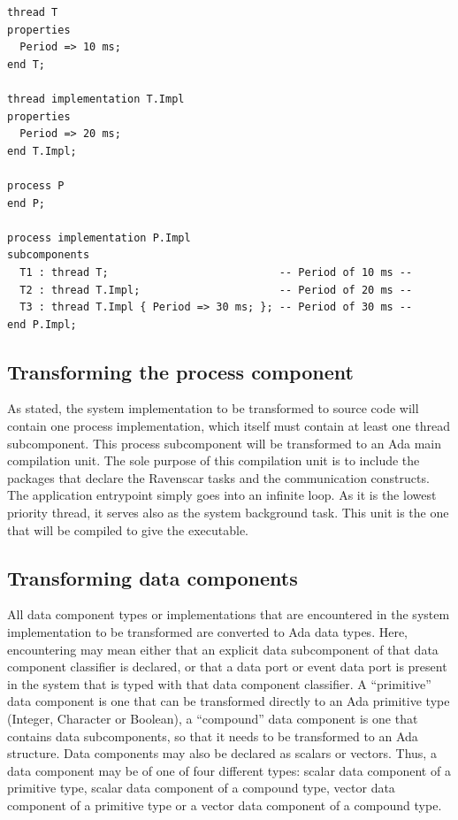 \begin{minipage}[htbp]{\listingwidth}
\lstset{language=aadl}
\begin{lstlisting}[label=lst:effective_prop, caption=The various
    property overriding options.]
thread T
properties
  Period => 10 ms;
end T;

thread implementation T.Impl
properties
  Period => 20 ms;
end T.Impl;

process P
end P;

process implementation P.Impl
subcomponents
  T1 : thread T;                           -- Period of 10 ms --
  T2 : thread T.Impl;                      -- Period of 20 ms --
  T3 : thread T.Impl { Period => 30 ms; }; -- Period of 30 ms --
end P.Impl;
\end{lstlisting}
\end{minipage}

\subsection{Transforming the process component}
As stated, the system implementation to be transformed to source code
will contain one process implementation, which itself must contain at
least one thread subcomponent. This process subcomponent will be
transformed to an Ada main compilation unit. The sole purpose of this
compilation unit is to include the packages that declare the Ravenscar
tasks and the communication constructs. The application entrypoint
simply goes into an infinite loop. As it is the lowest priority
thread, it serves also as the system background task. This unit is the
one that will be compiled to give the executable.

\subsection{Transforming data components}
All data component types or implementations that are encountered in
the system implementation to be transformed are converted to Ada data
types. Here, encountering may mean either that an explicit data
subcomponent of that data component classifier is declared, or that a
data port or event data port is present in the system that is typed
with that data component classifier. A ``primitive'' data component is
one that can be transformed directly to an Ada primitive type
(Integer, Character or Boolean), a ``compound'' data component is one
that contains data subcomponents, so that it needs to be transformed
to an Ada  structure. Data components may also be declared
as scalars or vectors. Thus, a data component may be of one of four
different types: scalar data component of a primitive type, scalar
data component of a compound type, vector data component of a
primitive type or a vector data component of a compound type.

